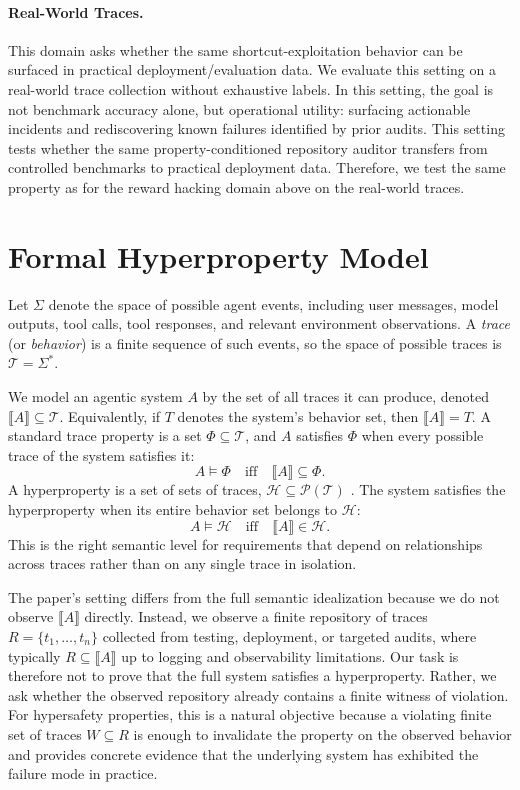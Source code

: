 \documentclass{article} %
\begin{document}
\paragraph{Real-World Traces.}
This domain asks whether the same shortcut-exploitation behavior can be surfaced in practical deployment/evaluation data.
We evaluate this setting on a real-world trace collection without exhaustive labels.
In this setting, the goal is not benchmark accuracy alone, but operational utility: surfacing actionable incidents and rediscovering known failures identified by prior audits.
This setting tests whether the same property-conditioned repository auditor transfers from controlled benchmarks to practical deployment data.
Therefore, we test the same property as for the reward hacking domain above on the real-world traces.

\section{Formal Hyperproperty Model}
\label{app:formalism}
Let $\Sigma$ denote the space of possible agent events, including user messages, model outputs, tool calls, tool responses, and relevant environment observations.
A \emph{trace} (or \emph{behavior}) is a finite sequence of such events, so the space of possible traces is $\mathcal{T}=\Sigma^*$.

We model an agentic system $A$ by the set of all traces it can produce, denoted $\llbracket A \rrbracket \subseteq \mathcal{T}$.
Equivalently, if $T$ denotes the system's behavior set, then $\llbracket A \rrbracket = T$.
A standard trace property is a set $\Phi \subseteq \mathcal{T}$, and $A$ satisfies $\Phi$ when every possible trace of the system satisfies it:
\[
  A \models \Phi \quad \mathrm{iff} \quad \llbracket A \rrbracket \subseteq \Phi.
\]
A hyperproperty is a set of sets of traces, $\mathcal{H} \subseteq \mathcal{P}(\mathcal{T})$ \citep{hyperproperties}.
The system satisfies the hyperproperty when its entire behavior set belongs to $\mathcal{H}$:
\[
  A \models \mathcal{H} \quad \mathrm{iff} \quad \llbracket A \rrbracket \in \mathcal{H}.
\]
This is the right semantic level for requirements that depend on relationships across traces rather than on any single trace in isolation.

The paper's setting differs from the full semantic idealization because we do not observe $\llbracket A \rrbracket$ directly.
Instead, we observe a finite repository of traces $R=\{t_1,\ldots,t_n\}$ collected from testing, deployment, or targeted audits, where typically $R \subseteq \llbracket A \rrbracket$ up to logging and observability limitations.
Our task is therefore not to prove that the full system satisfies a hyperproperty.
Rather, we ask whether the observed repository already contains a finite witness of violation.
For hypersafety properties, this is a natural objective because a violating finite set of traces $W \subseteq R$ is enough to invalidate the property on the observed behavior and provides concrete evidence that the underlying system has exhibited the failure mode in practice.
\end{document}
